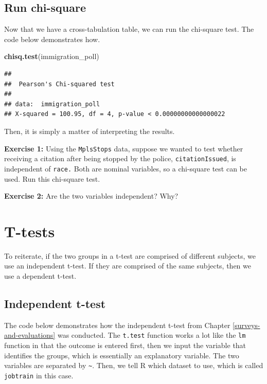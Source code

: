 \documentclass[
]{book}
\newenvironment{Shaded}{\begin{snugshade}}{\end{snugshade}}
\newcommand{\KeywordTok}[1]{\textcolor[rgb]{0.13,0.29,0.53}{\textbf{#1}}}
\newcommand{\NormalTok}[1]{#1}
\newenvironment{learncheck}%
{%
  \par\vspace{\baselineskip}\noindent 
  \color{Exercise}\begin{itshape}%
  \par\vspace{\baselineskip}\noindent\ignorespaces 
}%
{%
  \end{itshape}\ignorespacesafterend 
}
\begin{document}
\hypertarget{run-chi-square}{%
\subsection{Run chi-square}\label{run-chi-square}}

Now that we have a cross-tabulation table, we can run the chi-square test. The code below demonstrates how.

\begin{Shaded}
\begin{Highlighting}[]
\KeywordTok{chisq.test}\NormalTok{(immigration_poll)}
\end{Highlighting}
\end{Shaded}

\begin{verbatim}
## 
## 	Pearson's Chi-squared test
## 
## data:  immigration_poll
## X-squared = 100.95, df = 4, p-value < 0.00000000000000022
\end{verbatim}

Then, it is simply a matter of interpreting the results.

\begin{learncheck}
\textbf{Exercise 1:} Using the \texttt{MplsStops} data, suppose we
wanted to test whether receiving a citation after being stopped by the
police, \texttt{citationIssued}, is independent of \texttt{race.} Both
are nominal variables, so a chi-square test can be used. Run this
chi-square test.
\end{learncheck}

\begin{learncheck}
\textbf{Exercise 2:} Are the two variables independent? Why?
\end{learncheck}

\hypertarget{t-tests}{%
\section{T-tests}\label{t-tests}}

To reiterate, if the two groups in a t-test are comprised of different subjects, we use an independent t-test. If they are comprised of the same subjects, then we use a dependent t-test.

\hypertarget{independent-t-test}{%
\subsection{Independent t-test}\label{independent-t-test}}

The code below demonstrates how the independent t-test from Chapter \ref{surveys-and-evaluations} was conducted. The \texttt{t.test} function works a lot like the \texttt{lm} function in that the outcome is entered first, then we input the variable that identifies the groups, which is essentially an explanatory variable. The two variables are separated by \texttt{\textasciitilde{}}. Then, we tell R which dataset to use, which is called \texttt{jobtrain} in this case.
\end{document}
